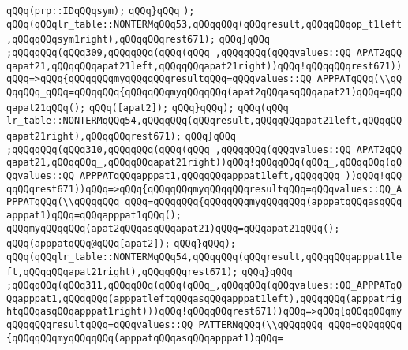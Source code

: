 \verb|qQQq(prp::IDqQQqsym);|\newline
\verb|qQQq}qQQq|\newline
\verb|);|\newline
\verb|qQQq(qQQqlr_table::NONTERMqQQq53,qQQqqQQq(qQQqresult,qQQqqQQqop_t1left,qQQqqQQqsym1right),qQQqqQQqrest671);|\newline
\verb|qQQq}qQQq|\newline
\verb|;qQQqqQQq(qQQq309,qQQqqQQq(qQQq(qQQq_,qQQqqQQq(qQQqvalues::QQ_APAT2qQQqapat21,qQQqqQQqapat21left,qQQqqQQqapat21right))qQQq!qQQqqQQqrest671))qQQq=>qQQq{qQQqqQQqmyqQQqqQQqresultqQQq=qQQqvalues::QQ_APPPATqQQq(\\qQQqqQQq_qQQq=qQQqqQQq{qQQqqQQqmyqQQqqQQq(apat2qQQqasqQQqapat21)qQQq=qQQqapat21qQQq();|\newline
\verb|qQQq([apat2]);|\newline
\verb|qQQq}qQQq);|\newline
\verb|qQQq(qQQq|\newline
\verb|lr_table::NONTERMqQQq54,qQQqqQQq(qQQqresult,qQQqqQQqapat21left,qQQqqQQqapat21right),qQQqqQQqrest671);|\newline
\verb|qQQq}qQQq|\newline
\verb|;qQQqqQQq(qQQq310,qQQqqQQq(qQQq(qQQq_,qQQqqQQq(qQQqvalues::QQ_APAT2qQQqapat21,qQQqqQQq_,qQQqqQQqapat21right))qQQq!qQQqqQQq(qQQq_,qQQqqQQq(qQQqvalues::QQ_APPPATqQQqapppat1,qQQqqQQqapppat1left,qQQqqQQq_))qQQq!qQQqqQQqrest671))qQQq=>qQQq{qQQqqQQqmyqQQqqQQqresultqQQq=qQQqvalues::QQ_APPPATqQQq(\\qQQqqQQq_qQQq=qQQqqQQq{qQQqqQQqmyqQQqqQQq(apppatqQQqasqQQq|\newline
\verb|apppat1)qQQq=qQQqapppat1qQQq();|\newline
\verb|qQQqmyqQQqqQQq(apat2qQQqasqQQqapat21)qQQq=qQQqapat21qQQq();|\newline
\verb|qQQq(apppatqQQq@qQQq[apat2]);|\newline
\verb|qQQq}qQQq);|\newline
\verb|qQQq(qQQqlr_table::NONTERMqQQq54,qQQqqQQq(qQQqresult,qQQqqQQqapppat1left,qQQqqQQqapat21right),qQQqqQQqrest671);|\newline
\verb|qQQq}qQQq|\newline
\verb|;qQQqqQQq(qQQq311,qQQqqQQq(qQQq(qQQq_,qQQqqQQq(qQQqvalues::QQ_APPPATqQQqapppat1,qQQqqQQq(apppatleftqQQqasqQQqapppat1left),qQQqqQQq(apppatrightqQQqasqQQqapppat1right)))qQQq!qQQqqQQqrest671))qQQq=>qQQq{qQQqqQQqmyqQQqqQQqresultqQQq=qQQqvalues::QQ_PATTERNqQQq(\\qQQqqQQq_qQQq=qQQqqQQq{qQQqqQQqmyqQQqqQQq(apppatqQQqasqQQqapppat1)qQQq=|\newline
